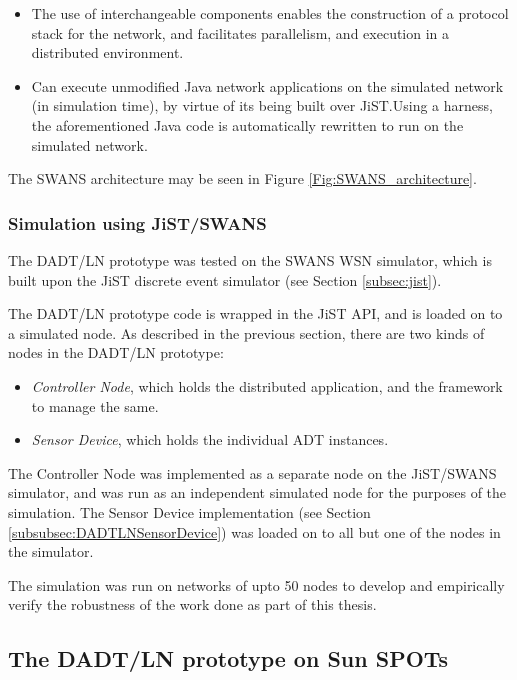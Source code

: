 \begin{itemize}
\item The use of
interchangeable components enables the construction of a protocol stack for the
network, and facilitates parallelism, and execution in a distributed environment.
\item Can execute unmodified Java network applications on the
simulated network (in simulation time), by virtue of its being built over
JiST.Using a harness, the aforementioned Java code is automatically rewritten to
run on the simulated network.  
\end{itemize}
   
The SWANS architecture may be seen in Figure \ref{Fig:SWANS_architecture}. 


\subsubsection{Simulation using JiST/SWANS}

The DADT/LN prototype was tested on the SWANS WSN simulator, which is built upon
the JiST discrete event simulator (see Section \ref{subsec:jist}). 

The DADT/LN prototype code is wrapped in the JiST API, and is loaded on to a
simulated node. As described in the previous section, there are two kinds of
nodes in the DADT/LN prototype:

\begin{itemize}
  \item \emph{Controller Node}, which holds the distributed application, and the
  framework to manage the same.
  \item \emph{Sensor Device}, which holds the individual ADT instances. 
\end{itemize}

The Controller Node was implemented as a separate node on the JiST/SWANS
simulator, and was run as an independent simulated node for the purposes of
the simulation. The Sensor Device implementation (see Section
\ref{subsubsec:DADTLNSensorDevice}) was loaded on to all but one of the nodes in
the simulator.

The simulation was run on networks of upto 50 nodes to develop and empirically verify the
robustness of the work done as part of this thesis.

\subsection{The DADT/LN prototype on Sun SPOTs}

